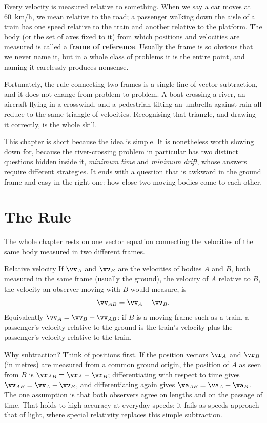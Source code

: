 \label{ch:relative}

Every velocity is measured relative to something. When we say a car moves at \SI{60}{km/h}, we mean
relative to the road; a passenger walking down the aisle of a train has one speed relative to the train
and another relative to the platform. The body (or the set of axes fixed to it) from which positions and
velocities are measured is called a \textbf{frame of reference}. Usually the frame is so obvious that we
never name it, but in a whole class of problems it is the entire point, and naming it carelessly
produces nonsense.

Fortunately, the rule connecting two frames is a single line of vector subtraction, and it does not
change from problem to problem. A boat crossing a river, an aircraft flying in a crosswind, and a
pedestrian tilting an umbrella against rain all reduce to the same triangle of velocities. Recognising
that triangle, and drawing it correctly, is the whole skill.

This chapter is short because the idea is simple. It is nonetheless worth slowing down for, because the
river-crossing problem in particular has two distinct questions hidden inside it, \emph{minimum time} and
\emph{minimum drift}, whose answers require different strategies. It ends with a question that is
awkward in the ground frame and easy in the right one: how close two moving bodies come to each other.

\section{The Rule}\label{sec:rule}

The whole chapter rests on one vector equation connecting the velocities of the same body measured in two
different frames.

\begin{defbox}{Relative velocity}
If $\vv_A$ and $\vv_B$ are the velocities of bodies $A$ and $B$, both measured in the same frame (usually
the ground), the velocity of $A$ relative to $B$, the velocity an observer moving with $B$ would measure, is
\[
\vv_{AB}=\vv_A-\vv_B.
\]
Equivalently $\vv_A=\vv_B+\vv_{AB}$: if $B$ is a moving frame such as a train, a passenger's velocity
relative to the ground is the train's velocity plus the passenger's velocity relative to the train.
\end{defbox}

Why subtraction? Think of positions first. If the position vectors $\vr_A$ and $\vr_B$ (in metres) are measured from a common ground origin, the
position of $A$ as seen from $B$ is $\vr_{AB}=\vr_A-\vr_B$; differentiating with respect to time gives
$\vv_{AB}=\vv_A-\vv_B$, and differentiating again gives $\va_{AB}=\va_A-\va_B$. The one assumption is that
both observers agree on lengths and on the passage of time. That holds to high accuracy at everyday
speeds; it fails as speeds approach that of light, where special relativity replaces this simple
subtraction.

